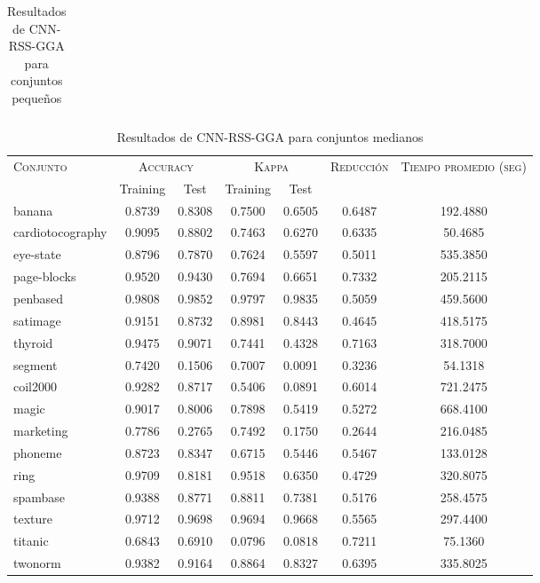\begin{table}[]
\begin{tabular}{l c c c c c c}
\hline
\end{tabular}
\caption{Resultados de CNN-RSS-GGA para conjuntos pequeños }
\label{res-peq-cnn-rss-gga}
\end{table}



\begin{table}[]
\centering
\begin{tabular}{l c c c c c c}
\hline
\multirow{2}{*}{\textsc{Conjunto}}
	& \multicolumn{2}{c}{\textsc{Accuracy}}
	& \multicolumn{2}{c}{\textsc{Kappa}}
	& \textsc{Reducción}
	& \textsc{Tiempo promedio (seg)} \\
	& Training & Test
	& Training & Test \\ 
\hline
\hline

banana & 0.8739 & 0.8308 & 0.7500 & 0.6505 & 0.6487 & 192.4880  \\
cardiotocography & 0.9095 & 0.8802 & 0.7463 & 0.6270 & 0.6335 & 50.4685  \\
eye-state & 0.8796 & 0.7870 & 0.7624 & 0.5597 & 0.5011 &  535.3850  \\
page-blocks & 0.9520 & 0.9430 & 0.7694 & 0.6651 & 0.7332 & 205.2115  \\
penbased & 0.9808 & 0.9852 & 0.9797 & 0.9835 & 0.5059 &  459.5600  \\
satimage & 0.9151 & 0.8732 & 0.8981 & 0.8443 & 0.4645 &  418.5175  \\
thyroid & 0.9475 & 0.9071 & 0.7441 & 0.4328 & 0.7163 &  318.7000  \\
segment & 0.7420 & 0.1506 & 0.7007 & 0.0091 & 0.3236 & 54.1318  \\
coil2000 & 0.9282 & 0.8717 & 0.5406 & 0.0891 & 0.6014 &  721.2475  \\
magic & 0.9017 & 0.8006 & 0.7898 & 0.5419 & 0.5272 &  668.4100  \\
marketing & 0.7786 & 0.2765 & 0.7492 & 0.1750 & 0.2644 & 216.0485  \\
phoneme & 0.8723 & 0.8347 & 0.6715 & 0.5446 & 0.5467 & 133.0128  \\
ring & 0.9709 & 0.8181 & 0.9518 & 0.6350 & 0.4729 &  320.8075  \\
spambase & 0.9388 & 0.8771 & 0.8811 & 0.7381 & 0.5176 &  258.4575  \\
texture & 0.9712 & 0.9698 & 0.9694 & 0.9668 & 0.5565 &  297.4400  \\
titanic & 0.6843 & 0.6910 & 0.0796 & 0.0818 & 0.7211 & 75.1360  \\
twonorm & 0.9382 & 0.9164 & 0.8864 & 0.8327 & 0.6395 &  335.8025  \\

\hline
\end{tabular}
\caption{Resultados de CNN-RSS-GGA para conjuntos medianos }
\label{res-med-cnn-rss-gga}
\end{table}



